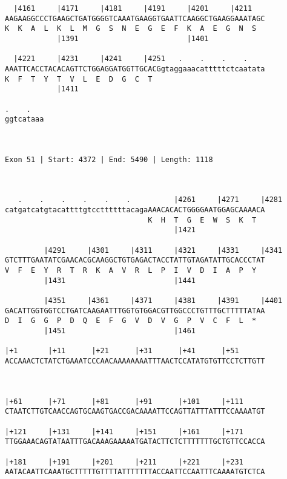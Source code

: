 \documentclass{article}
\begin{document}
\begin{Verbatim}
  |4161     |4171     |4181     |4191     |4201     |4211   
AAGAAGGCCCTGAAGCTGATGGGGTCAAATGAAGGTGAATTCAAGGCTGAAGGAAATAGC
K  K  A  L  K  L  M  G  S  N  E  G  E  F  K  A  E  G  N  S  
            |1391                         |1401             
  
  |4221     |4231     |4241     |4251   .    .    .    .    
AAATTCACCTACACAGTTCTGGAGGATGGTTGCACGgtaggaaacatttttctcaatata
K  F  T  Y  T  V  L  E  D  G  C  T                          
            |1411                                           
  
.    .   
ggtcataaa
         
         
 
Exon 51 | Start: 4372 | End: 5490 | Length: 1118



   .    .    .    .    .    .          |4261     |4271     |4281
catgatcatgtacattttgtccttttttacagaAAACACACTGGGGAATGGAGCAAAACA
                                 K  H  T  G  E  W  S  K  T  
                                       |1421                
  
         |4291     |4301     |4311     |4321     |4331     |4341
GTCTTTGAATATCGAACACGCAAGGCTGTGAGACTACCTATTGTAGATATTGCACCCTAT
V  F  E  Y  R  T  R  K  A  V  R  L  P  I  V  D  I  A  P  Y  
         |1431                         |1441                
  
         |4351     |4361     |4371     |4381     |4391     |4401
GACATTGGTGGTCCTGATCAAGAATTTGGTGTGGACGTTGGCCCTGTTTGCTTTTTATAA
D  I  G  G  P  D  Q  E  F  G  V  D  V  G  P  V  C  F  L  *  
         |1451                         |1461                
  
|+1       |+11      |+21      |+31      |+41      |+51      
ACCAAACTCTATCTGAAATCCCAACAAAAAAAATTTAACTCCATATGTGTTCCTCTTGTT
 
                                                            
  
|+61      |+71      |+81      |+91      |+101     |+111     
CTAATCTTGTCAACCAGTGCAAGTGACCGACAAAATTCCAGTTATTTATTTCCAAAATGT
                                                            
|+121     |+131     |+141     |+151     |+161     |+171     
TTGGAAACAGTATAATTTGACAAAGAAAAATGATACTTCTCTTTTTTTGCTGTTCCACCA
                                                            
|+181     |+191     |+201     |+211     |+221     |+231     
AATACAATTCAAATGCTTTTTGTTTTATTTTTTTACCAATTCCAATTTCAAAATGTCTCA
                                                            

\end{Verbatim}
\end{document}
